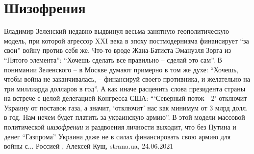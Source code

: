  
 
 
 
 
\chapter{Шизофрения}

Владимир Зеленский недавно выдвинул весьма занятную геополитическую модель, при
которой агрессор XXI века в эпоху постмодернизма финансирует \enquote{за свои}
войну против себя же. Что-то вроде Жана-Батиста Эмануэля Зорга из
\enquote{Пятого элемента}: \enquote{Хочешь сделать все правильно – сделай это
сам}.  В понимании Зеленского – в Москве думают примерно в том же духе:
\enquote{Хочешь, чтобы война не заканчивалась, – финансируй своего противника,
и желательно на три миллиарда долларов в год}.  А как иначе расценить слова
президента страны на встрече с целой делегацией Конгресса США:
\enquote{\enquote{Северный поток - 2} отключит Украину от поставок газа, а
значит, \enquote{отключит} нас как минимум от 3 млрд долл. в год. Нам нечем
будет платить за украинскую армию}.  В этой модели массовой политической
\emph{шизофрении} и раздвоения личности выходит, что без Путина и денег
\enquote{Газпрома} Украина даже не в силах финансировать свою армию для войны
с... Россией
, 
Алексей Кущ, strana.ua, 24.06.2021

